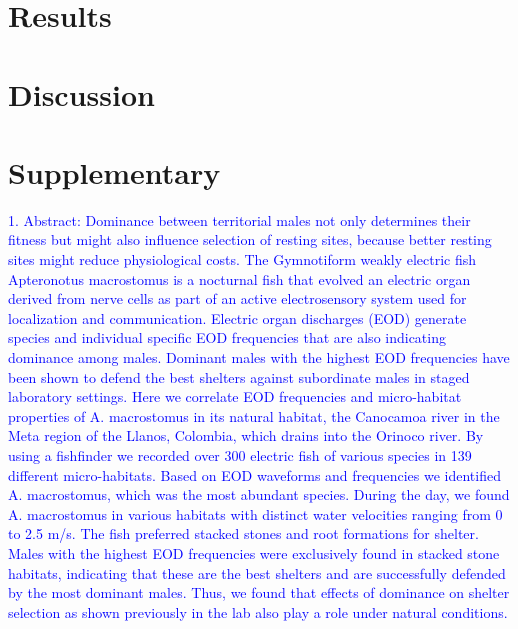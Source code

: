 \documentclass[12pt,a4paper,pdftex]{article}
\begin{document}
\newpage
\section{Results}
 


\newpage
\section{Discussion}
 


\newpage
{}



\newpage
\section{Supplementary}

\textcolor{blue}{1. Abstract: Dominance between territorial males not only determines their fitness but might also influence selection of resting sites, because better resting sites might reduce physiological costs. The Gymnotiform weakly electric fish Apteronotus macrostomus is a nocturnal fish that evolved an electric organ derived from nerve cells as part of an active electrosensory system used for localization and communication. Electric organ discharges (EOD) generate species and individual specific EOD frequencies that are also indicating dominance among males. Dominant males with the highest EOD frequencies have been shown to defend the best shelters against subordinate males in staged laboratory settings. Here we correlate EOD frequencies and micro-habitat properties of A. macrostomus in its natural habitat, the Canocamoa river in the Meta region of the Llanos, Colombia, which drains into the Orinoco river. By using a fishfinder we recorded over 300 electric fish of various species in 139 different micro-habitats. Based on EOD waveforms and frequencies we identified A. macrostomus, which was the most abundant species. During the day, we found A. macrostomus in various habitats with distinct water velocities ranging from 0 to 2.5 m/s. The fish preferred stacked stones and root formations for shelter. Males with the highest EOD frequencies were exclusively found in stacked stone habitats, indicating that these are the best shelters and are successfully defended by the most dominant males. Thus, we found that effects of dominance on shelter selection as shown previously in the lab also play a role under natural conditions.}\\
\end{document}
